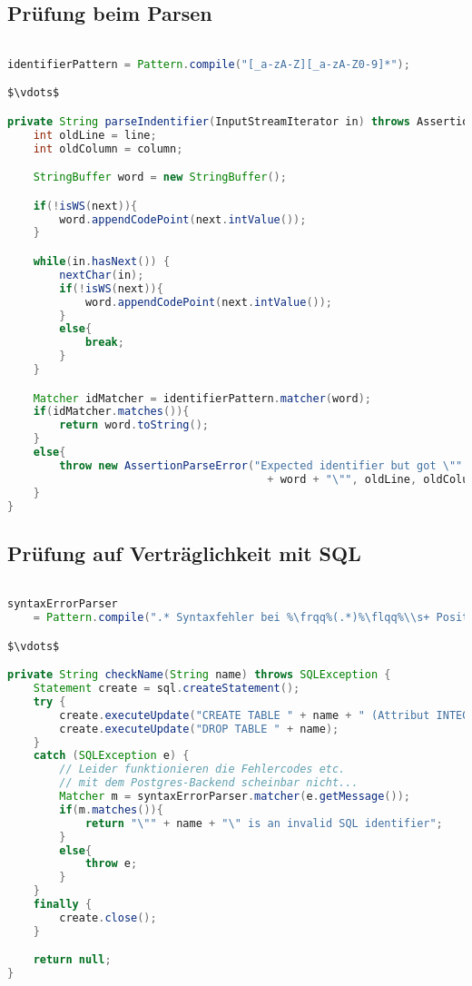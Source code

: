 \documentclass[a4paper]{article}
\begin{document}
\subsection{Prüfung beim Parsen}
\begin{lstlisting}[language=java,mathescape=true]

identifierPattern = Pattern.compile("[_a-zA-Z][_a-zA-Z0-9]*");

$\vdots$

private String parseIndentifier(InputStreamIterator in) throws AssertionParseError {
    int oldLine = line;
    int oldColumn = column;

    StringBuffer word = new StringBuffer();

    if(!isWS(next)){
        word.appendCodePoint(next.intValue());
    }

    while(in.hasNext()) {
        nextChar(in);
        if(!isWS(next)){
            word.appendCodePoint(next.intValue());
        }
        else{
            break;
        }
    }

    Matcher idMatcher = identifierPattern.matcher(word);
    if(idMatcher.matches()){
        return word.toString();
    }
    else{
        throw new AssertionParseError("Expected identifier but got \""
                                        + word + "\"", oldLine, oldColumn);
    }
}
\end{lstlisting}

\subsection{Prüfung auf Verträglichkeit mit SQL}
\begin{lstlisting}[language=java,mathescape=true,escapechar=\%]

syntaxErrorParser
    = Pattern.compile(".* Syntaxfehler bei %\frqq%(.*)%\flqq%\\s+ Position: (\\d+).*");

$\vdots$

private String checkName(String name) throws SQLException {
    Statement create = sql.createStatement();
    try {
        create.executeUpdate("CREATE TABLE " + name + " (Attribut INTEGER)");
        create.executeUpdate("DROP TABLE " + name);
    }
    catch (SQLException e) {
        // Leider funktionieren die Fehlercodes etc.
        // mit dem Postgres-Backend scheinbar nicht...
        Matcher m = syntaxErrorParser.matcher(e.getMessage());
        if(m.matches()){
            return "\"" + name + "\" is an invalid SQL identifier";
        }
        else{
            throw e;
        }
    }
    finally {
        create.close();
    }

    return null;
}
\end{lstlisting}
\end{document}
